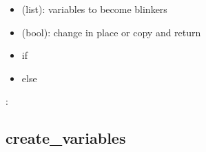 \documentclass[letterpaper,10pt,english]{sphinxmanual}
\begin{document}
\begin{fulllineitems}
\begin{description}
\begin{itemize}
\item {} 
 (list): variables to become blinkers

\item {} 
 (bool): change  in place or copy and return

\end{itemize}

\item[{\sphinxstylestrong{returns}:}] \leavevmode\begin{itemize}
\item {} 
 if 

\item {} 
 else

\end{itemize}

\end{description}

:

\begin{sphinxVerbatim}[commandchars=\\\{\}]
  \PYG{p}{[} \PYG{p}{]}
 
\end{sphinxVerbatim}

\end{fulllineitems}



\subsection{create\_variables}
\label{\detokenize{PrimeImplicants:create-variables}}\label{\detokenize{PrimeImplicants:id9}}
\end{document}
